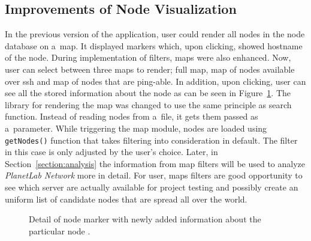 {{{{{{\subsection{Improvements of Node Visualization}
In the previous version of the application, user could render all nodes in the node database on a~map. It displayed markers which, upon clicking, showed hostname of the node. During implementation of filters, maps were also enhanced. Now, user can select between three maps to render; full map, map of nodes available over ssh and map of nodes that are ping-able. In addition, upon clicking, user can see all the stored information about the node as can be seen in Figure~\ref{fig:mapnodedetail}. The library for rendering the map was changed to use the same principle as search function. Instead of reading nodes from a~file, it gets them passed as a~parameter. While triggering the map module, nodes are loaded using \texttt{getNodes()} function that takes filtering into consideration in default. The filter in this case is only adjusted by the user's choice. Later, in Section~\ref{section:analysis} the information from map filters will be used to analyze \textit{PlanetLab Network} more in detail. For user, maps filters are good opportunity to see which server are actually available for project testing and possibly create an uniform list of candidate nodes that are spread all over the world. 

\begin{figure}[H]
	\centering
	\caption{Detail of node marker with newly added information about the particular node \cite{OpenStreetMap}.}
	\label{fig:mapnodedetail}
\end{figure}

}}}}}}
